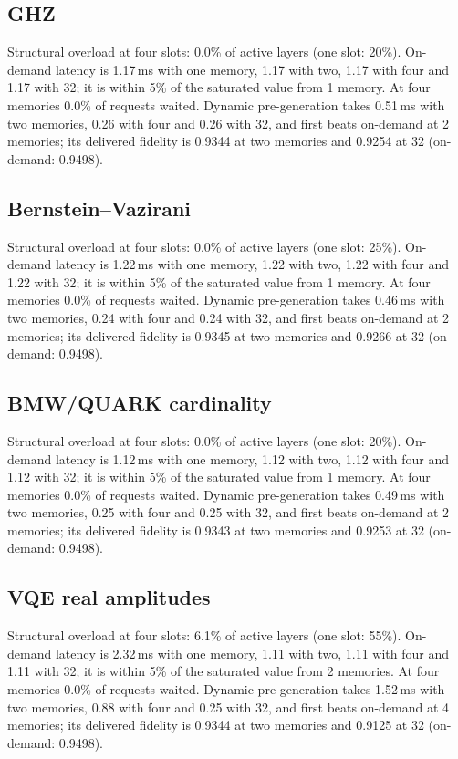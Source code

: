 \subsection*{GHZ}
Structural overload at four slots: 0.0\% of active layers (one slot: 20\%). On-demand latency is 1.17\,ms with one memory, 1.17 with two, 1.17 with four and 1.17 with 32; it is within 5\% of the saturated value from 1 memory. At four memories 0.0\% of requests waited. Dynamic pre-generation takes 0.51\,ms with two memories, 0.26 with four and 0.26 with 32, and first beats on-demand at 2 memories; its delivered fidelity is 0.9344 at two memories and 0.9254 at 32 (on-demand: 0.9498).

\subsection*{Bernstein--Vazirani}
Structural overload at four slots: 0.0\% of active layers (one slot: 25\%). On-demand latency is 1.22\,ms with one memory, 1.22 with two, 1.22 with four and 1.22 with 32; it is within 5\% of the saturated value from 1 memory. At four memories 0.0\% of requests waited. Dynamic pre-generation takes 0.46\,ms with two memories, 0.24 with four and 0.24 with 32, and first beats on-demand at 2 memories; its delivered fidelity is 0.9345 at two memories and 0.9266 at 32 (on-demand: 0.9498).

\subsection*{BMW/QUARK cardinality}
Structural overload at four slots: 0.0\% of active layers (one slot: 20\%). On-demand latency is 1.12\,ms with one memory, 1.12 with two, 1.12 with four and 1.12 with 32; it is within 5\% of the saturated value from 1 memory. At four memories 0.0\% of requests waited. Dynamic pre-generation takes 0.49\,ms with two memories, 0.25 with four and 0.25 with 32, and first beats on-demand at 2 memories; its delivered fidelity is 0.9343 at two memories and 0.9253 at 32 (on-demand: 0.9498).

\subsection*{VQE real amplitudes}
Structural overload at four slots: 6.1\% of active layers (one slot: 55\%). On-demand latency is 2.32\,ms with one memory, 1.11 with two, 1.11 with four and 1.11 with 32; it is within 5\% of the saturated value from 2 memories. At four memories 0.0\% of requests waited. Dynamic pre-generation takes 1.52\,ms with two memories, 0.88 with four and 0.25 with 32, and first beats on-demand at 4 memories; its delivered fidelity is 0.9344 at two memories and 0.9125 at 32 (on-demand: 0.9498).

